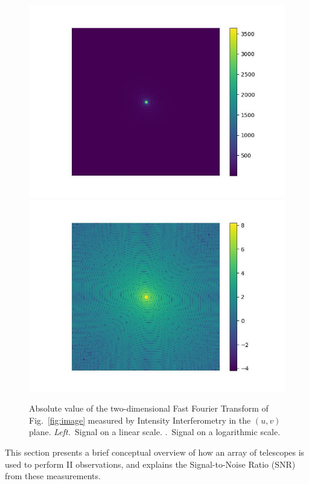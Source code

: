 \begin{figure}
		\includegraphics[width=.49\linewidth]{fig/ft/ft.jpg}\hfil
		\includegraphics[width=.49\linewidth]{fig/ft/ft_log.jpg}
	\caption{Absolute value of the two-dimensional Fast Fourier Transform of Fig.~\ref{fig:image} measured by Intensity Interferometry in the $(u, v)$ plane. \textit{Left.}~Signal on a linear scale. .~Signal on a logarithmic scale.}
	\label{fig:ft}
\end{figure}
This section presents a brief conceptual overview of how an array of telescopes is used to perform II observations, and explains the Signal-to-Noise Ratio (SNR) from these measurements.
